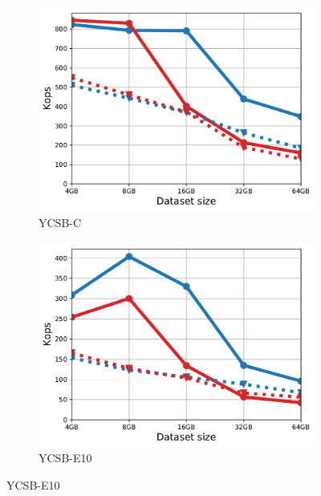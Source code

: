 \begin{figure}[tb]
\begin{subfigure}{0.3\linewidth}
\includegraphics[width=\textwidth]{figs/Workload_C_line.pdf}
\caption{YCSB-C}
\label{fig:throughput:c}
\end{subfigure}
\begin{subfigure}{0.3\linewidth}
\includegraphics[width=\textwidth]{figs/Workload_E-_line.pdf}
\caption{YCSB-E10}

\end{subfigure}
\end{figure}
